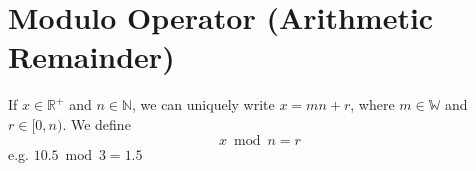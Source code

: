 \documentclass{article}
\title{}
\author{}
\date{}
\begin{document}
\maketitle

\section{Modulo Operator (Arithmetic Remainder)}
If $x \in \mathbb{R}^+$ and $n \in \mathbb{N}$, we can uniquely write $x=mn+r$, where $m \in \mathbb{W}$ and $r \in [0,n)$.
\newline
We define $$x \bmod n=r$$
\newline
e.g. $10.5 \bmod 3=1.5$
\end{document}
